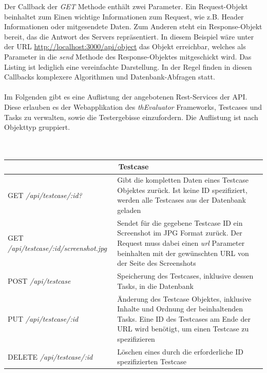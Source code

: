 Der Callback der \textit{GET} Methode enthält zwei Parameter. Ein Request-Objekt beinhaltet zum Einen wichtige Informationen zum Request, wie z.B. Header Informationen oder mitgesendete Daten. Zum Anderen steht ein Response-Objekt bereit, das die Antwort des Servers repräsentiert. In diesem Beispiel wäre unter der URL \url{http://localhost:3000/api/object} das Objekt erreichbar, welches als Parameter in die \textit{send} Methode des Response-Objektes mitgeschickt wird. Das Listing ist lediglich eine vereinfachte Darstellung. In der Regel finden in diesen Callbacks komplexere Algorithmen und Datenbank-Abfragen statt.\\
\\
Im Folgenden gibt es eine Auflistung der angebotenen Rest-Services der API. Diese erlauben es der Webapplikation des \textit{thEvaluator} Frameworks, Testcases und Tasks zu verwalten, sowie die Testergebisse einzufordern. Die Auflistung ist nach Objekttyp gruppiert.\\
\\
\\
{\footnotesize
\begin{tabular}{ p{5.5cm} p{9cm} }
  \hline
  \multicolumn{2}{c}{\textbf{Testcase}} \\
  \hline
  GET \textit{/api/testcase/:id?} & Gibt die kompletten Daten eines Testcase Objektes zurück. Ist keine ID spezifiziert, werden alle Testcases aus der Datenbank geladen\vspace{0.2cm}\\
  GET \textit{/api/testcase/:id/screenshot.jpg} & Sendet für die gegebene Testcase ID ein Screenshot im JPG Format zurück. Der Request muss dabei einen \textit{url} Parameter beinhalten mit der gewünschten URL von der Seite des Screenshots\vspace{0.2cm}\\
  POST \textit{/api/testcase} & Speicherung des Testcases, inklusive dessen Tasks, in die Datenbank\vspace{0.2cm}\\
  PUT \textit{/api/testcase/:id} & Änderung des Testcase Objektes, inklusive Inhalte und Ordnung der beinhaltenden Tasks. Eine ID des Testcases am Ende der URL wird benötigt, um einen Testcase zu spezifizieren\vspace{0.2cm}\\
  DELETE \textit{/api/testcase/:id} & Löschen eines durch die erforderliche ID spezifizierten Testcase\vspace{0.2cm}\\
  \hline
\end{tabular}
}
